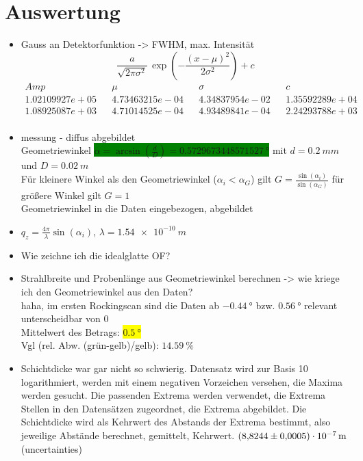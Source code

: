 \section{Auswertung}
\begin{itemize}
	\item Gauss an Detektorfunktion -> FWHM, max. Intensität
	\begin{equation*}
		\frac{a}{\sqrt{2 \pi \sigma^2}} \, \exp{\left(-\frac{\left(x-\mu \right)^2}{2 \sigma^2}\right)}+c
	\end{equation*}
	\begin{align}
		Amp && \mu && \sigma && c \\
		1.02109927e+05 && 4.73463215e-04 && 4.34837954e-02 && 1.35592289e+04 \\
		1.08925087e+03 && 4.71014525e-04 && 4.93489841e-04 && 2.24293788e+03 \\
	\end{align}
	\item messung - diffus abgebildet\\
	Geometriewinkel \colorbox{green}{$\alpha = \arcsin{\left( \frac{d}{D}\right)} = \SI{0.5729673448571527}{°}$} mit $d=\SI{0.2}{mm}$ und $D=\SI{0.02}{m}$\\
	Für kleinere Winkel als den Geometriewinkel ($\alpha_i < \alpha_G$) gilt $G = \frac{\sin{(\alpha_i)}}{\sin{(\alpha_G)}}$ für größere Winkel gilt $G=1$\\
	Geometriewinkel in die Daten eingebezogen, abgebildet
	\item $q_z=\frac{4\pi}{\lambda}\sin{(\alpha_i)}$, $\lambda = \SI{1.54e-10}{m}$
	\item Wie zeichne ich die idealglatte OF?
	\item Strahlbreite und Probenlänge aus Geometriewinkel berechnen -> wie kriege ich den Geometriewinkel aus den Daten?\\
	haha, im ersten Rockingscan sind die Daten ab $\SI{-0.44}{°}$ bzw. $\SI{0.56}{°}$ relevant unterscheidbar von 0\\
	Mittelwert des Betrags: \colorbox{yellow}{$\SI{0.5}{°}$} \\
	Vgl (rel. Abw. (grün-gelb)/gelb): $\SI{14.59}{\%}$
	\item Schichtdicke war gar nicht so schwierig. Datensatz wird zur Basis 10 logarithmiert, werden mit einem negativen Vorzeichen versehen, die Maxima werden gesucht.
	Die passenden Extrema werden verwendet, die Extrema Stellen in den Datensätzen zugeordnet, die Extrema abgebildet.
	Die Schichtdicke wird als Kehrwert des Abstands der Extrema bestimmt, also jeweilige Abstände berechnet, gemittelt, Kehrwert.
	$\SI{8.8244 \pm 0.0005 e-07}{m}$ (uncertainties)
\end{itemize}
